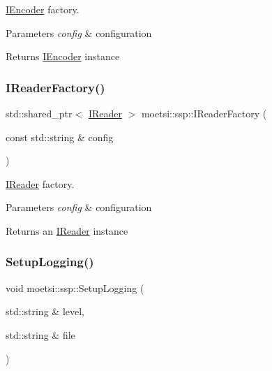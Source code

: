 \hyperlink{classmoetsi_1_1ssp_1_1IEncoder}{I\+Encoder} factory. 


\begin{DoxyParams}{Parameters}
{\em config} & configuration \\
\hline
\end{DoxyParams}
\begin{DoxyReturn}{Returns}
\hyperlink{classmoetsi_1_1ssp_1_1IEncoder}{I\+Encoder} instance 
\end{DoxyReturn}
\mbox{\label{namespacemoetsi_1_1ssp_ad5e820c4c6a1a43d5e85608a06b86ea8}} 
\subsubsection{\texorpdfstring{I\+Reader\+Factory()}{IReaderFactory()}}
{\footnotesize\ttfamily std\+::shared\+\_\+ptr$<$ \hyperlink{classmoetsi_1_1ssp_1_1IReader}{I\+Reader} $>$ moetsi\+::ssp\+::\+I\+Reader\+Factory (\begin{DoxyParamCaption}\item[{const std\+::string \&}]{config }\end{DoxyParamCaption})}



\hyperlink{classmoetsi_1_1ssp_1_1IReader}{I\+Reader} factory. 


\begin{DoxyParams}{Parameters}
{\em config} & configuration \\
\hline
\end{DoxyParams}
\begin{DoxyReturn}{Returns}
an \hyperlink{classmoetsi_1_1ssp_1_1IReader}{I\+Reader} instance 
\end{DoxyReturn}
\mbox{\label{namespacemoetsi_1_1ssp_a0af356ab87e92f92c49e7118b9cb1ba2}} 
\subsubsection{\texorpdfstring{Setup\+Logging()}{SetupLogging()}\hspace{0.1cm}{\footnotesize\ttfamily [1/2]}}
{\footnotesize\ttfamily void moetsi\+::ssp\+::\+Setup\+Logging (\begin{DoxyParamCaption}\item[{std\+::string \&}]{level,  }\item[{std\+::string \&}]{file }\end{DoxyParamCaption})}



